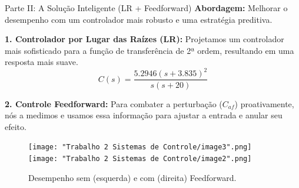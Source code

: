 \documentclass{beamer}
\begin{document}
\begin{frame}{Parte II: A Solução Inteligente (LR + Feedforward)}
    \large \textbf{Abordagem:} Melhorar o desempenho com um controlador mais robusto e uma estratégia preditiva.
    \vspace{0.5em}
    
    \small
    \textbf{1. Controlador por Lugar das Raízes (LR):} Projetamos um controlador mais sofisticado para a função de transferência de 2ª ordem, resultando em uma resposta mais suave.
    \tiny \[ C(s)=\frac{5.2946(s+3.835)^2}{s(s+20)} \]
    
    \vspace{0.5em}
    \small
    \textbf{2. Controle Feedforward:} Para combater a perturbação (\(C_{af}\)) proativamente, nós a medimos e usamos essa informação para ajustar a entrada e anular seu efeito.
    
    \begin{figure}
        \texttt{[image: "Trabalho 2 Sistemas de Controle/image3".png]}
        \texttt{[image: "Trabalho 2 Sistemas de Controle/image2".png]}
        \caption{\tiny Desempenho sem (esquerda) e com (direita) Feedforward.}
    \end{figure}
    
\end{frame}
\end{document}
